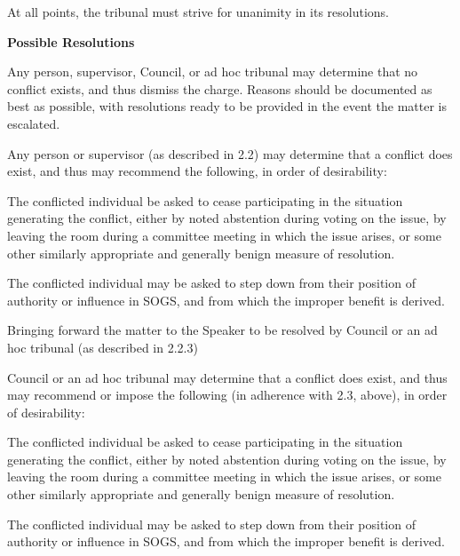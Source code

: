\begin{longenum}[ label*=\arabic*., align=left]
\begin{longenum}[ label*=\arabic*., align=left]
        \item At all points, the tribunal must strive for unanimity in its resolutions.
	\end{longenum}
	\item \textbf{Possible Resolutions}
	\begin{longenum}[ label*=\arabic*., align=left]
		\item Any person, supervisor, Council, or ad hoc tribunal may determine that no conflict exists, and thus dismiss the charge. Reasons should be documented as best as possible, with resolutions ready to be provided in the event the matter is escalated.
        \item Any person or supervisor (as described in 2.2) may determine that a conflict does exist, and thus may recommend the following, in order of desirability:
		\begin{longenum}[ label*=\arabic*., align=left]
			\item The conflicted individual be asked to cease participating in the situation generating the conflict, either by noted abstention during voting on the issue, by leaving the room during a committee meeting in which the issue arises, or some other similarly appropriate and generally benign measure of resolution.  
            \item The conflicted individual may be asked to step down from their position of authority or influence in SOGS, and from which the improper benefit is derived.
            \item Bringing forward the matter to the Speaker to be resolved by Council or an ad hoc tribunal (as described in 2.2.3)
		\end{longenum}
        \item Council or an ad hoc tribunal may determine that a conflict does exist, and thus may recommend or impose the following (in adherence with 2.3, above), in order of desirability:
		\begin{longenum}[ label*=\arabic*., align=left]
			\item The conflicted individual be asked to cease participating in the situation generating the conflict, either by noted abstention during voting on the issue, by leaving the room during a committee meeting in which the issue arises, or some other similarly appropriate and generally benign measure of resolution. 
            \item The conflicted individual may be asked to step down from their position of authority or influence in SOGS, and from which the improper benefit is derived.

\end{longenum}
\end{longenum}
\end{longenum}
